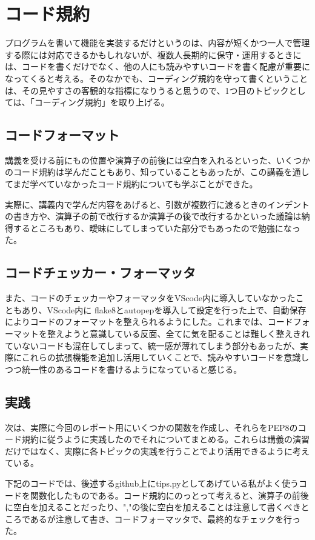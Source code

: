 \documentclass[12pt]{jsarticle}
\begin{document}
\section{コード規約}
プログラムを書いて機能を実装するだけというのは、内容が短くかつ一人で管理する際には対応できるかもしれないが、複数人長期的に保守・運用するときには、コードを書くだけでなく、他の人にも読みやすいコードを書く配慮が重要になってくると考える。そのなかでも、コーディング規約を守って書くということは、その見やすさの客観的な指標になりうると思うので、1つ目のトピックとしては、「コーディング規約」を取り上げる。

\subsection{コードフォーマット}
講義を受ける前にも{}の位置や演算子の前後には空白を入れるといった、いくつかのコード規約は学んだこともあり、知っていることもあったが、この講義を通してまだ学べていなかったコード規約についても学ぶことができた。

実際に、講義内で学んだ内容をあげると、引数が複数行に渡るときのインデントの書き方や、演算子の前で改行するか演算子の後で改行するかといった議論は納得するところもあり、曖昧にしてしまっていた部分でもあったので勉強になった。

\subsection{コードチェッカー・フォーマッタ}
また、コードのチェッカーやフォーマッタをVScode内に導入していなかったこともあり、VScode内に flake8とautopepを導入して設定を行った上で、自動保存によりコードのフォーマットを整えられるようにした。これまでは、コードフォーマットを整えようと意識している反面、全てに気を配ることは難しく整えきれていないコードも混在してしまって、統一感が薄れてしまう部分もあったが、実際にこれらの拡張機能を追加し活用していくことで、読みやすいコードを意識しつつ統一性のあるコードを書けるようになっていると感じる。

\subsection{実践}
次は、実際に今回のレポート用にいくつかの関数を作成し、それらをPEP8のコード規約に従うように実践したのでそれについてまとめる。これらは講義の演習だけではなく、実際に各トピックの実践を行うことでより活用できるように考えている。

下記のコードでは、後述するgithub上にtips.pyとしてあげている私がよく使うコードを関数化したものである。コード規約にのっとって考えると、演算子の前後に空白を加えることだったり、","の後に空白を加えることは注意して書くべきところであるが注意して書き、コードフォーマッタで、最終的なチェックを行った。
\end{document}
